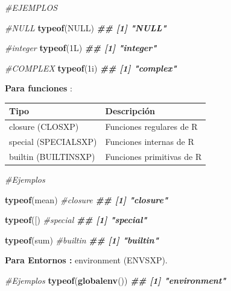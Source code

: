 \documentclass[
]{book}
\newenvironment{Shaded}{\begin{snugshade}}{\end{snugshade}}
\newcommand{\AttributeTok}[1]{\textcolor[rgb]{0.13,0.29,0.53}{#1}}
\newcommand{\CommentTok}[1]{\textcolor[rgb]{0.56,0.35,0.01}{\textit{#1}}}
\newcommand{\ConstantTok}[1]{\textcolor[rgb]{0.56,0.35,0.01}{#1}}
\newcommand{\DocumentationTok}[1]{\textcolor[rgb]{0.56,0.35,0.01}{\textbf{\textit{#1}}}}
\newcommand{\FunctionTok}[1]{\textcolor[rgb]{0.13,0.29,0.53}{\textbf{#1}}}
\newcommand{\NormalTok}[1]{#1}
\newcommand{\StringTok}[1]{\textcolor[rgb]{0.31,0.60,0.02}{#1}}
\begin{document}
\begin{Shaded}
\begin{Highlighting}[]
\CommentTok{\#EJEMPLOS}

\CommentTok{\#NULL}
\FunctionTok{typeof}\NormalTok{(}\ConstantTok{NULL}\NormalTok{)}
\DocumentationTok{\#\# [1] "NULL"}


\CommentTok{\#integer}
\FunctionTok{typeof}\NormalTok{(1L)}
\DocumentationTok{\#\# [1] "integer"}


\CommentTok{\#COMPLEX}
\FunctionTok{typeof}\NormalTok{(1i)}
\DocumentationTok{\#\# [1] "complex"}
\end{Highlighting}
\end{Shaded}

\textbf{Para funciones} :

\begin{longtable}[]{@{}ll@{}}
\toprule\noalign{}
Tipo & Descripción \\
\midrule\noalign{}
\endhead
\bottomrule\noalign{}
\endlastfoot
closure (CLOSXP) & Funciones regulares de R \\
special (SPECIALSXP) & Funciones internas de R \\
builtin (BUILTINSXP) & Funciones primitivas de R \\
\end{longtable}

\begin{Shaded}
\begin{Highlighting}[]
\CommentTok{\#Ejemplos}

\FunctionTok{typeof}\NormalTok{(mean) }\CommentTok{\#closure}
\DocumentationTok{\#\# [1] "closure"}

\FunctionTok{typeof}\NormalTok{(}\StringTok{\textasciigrave{}}\AttributeTok{[}\StringTok{\textasciigrave{}}\NormalTok{) }\CommentTok{\#special}
\DocumentationTok{\#\# [1] "special"}

\FunctionTok{typeof}\NormalTok{(sum) }\CommentTok{\#builtin}
\DocumentationTok{\#\# [1] "builtin"}
\end{Highlighting}
\end{Shaded}

\textbf{Para Entornos :} environment (ENVSXP).

\begin{Shaded}
\begin{Highlighting}[]
\CommentTok{\#Ejemplos}
\FunctionTok{typeof}\NormalTok{(}\FunctionTok{globalenv}\NormalTok{())}
\DocumentationTok{\#\# [1] "environment"}
\end{Highlighting}
\end{Shaded}
\end{document}
